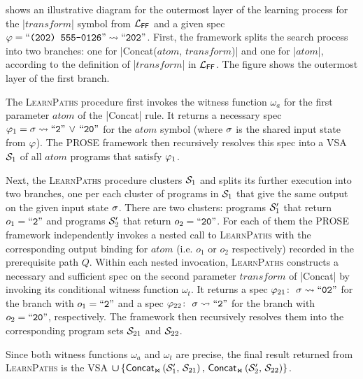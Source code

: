 \begin{example}
     shows an illustrative diagram for the outermost layer of the learning process for
    the \dslinline|$transform$| symbol from $\ffdsl$ and a given spec $\spec = \stringliteral{(202) 555-0126} \tospec
    \stringliteral{202}$.
    First, the framework splits the search process into two branches: one for \dslinline|Concat($atom$, $transform$)|
    and one for \dslinline|$atom$|, according to the definition of \dslinline|$transform$| in $\ffdsl$.
    The figure shows the outermost layer of the first branch.

    The \textsc{LearnPaths} procedure first invokes the witness function $\omega_a$ for the first
    parameter $atom$ of the \dslinline|Concat| rule.
    It returns a necessary spec $\spec_1 = \state \tospec \stringliteral{2} \,\vee\,
    \stringliteral{20}$ for the $atom$ symbol (where $\state$ is the shared input state from $\spec$).
    The PROSE framework then recursively resolves this spec into a VSA $\vsa_1$ of all $atom$ programs that satisfy
    $\spec_1$.

    Next, the \textsc{LearnPaths} procedure clusters $\vsa_1$ and splits its further execution into two branches, one
    per each cluster of programs in $\vsa_1$ that give the same output on the given input state $\state$.
    There are two clusters: programs $\vsa'_1$ that return $o_1 = \stringliteral{2}$ and programs $\vsa'_2$ that return
    $o_2 = \stringliteral{20}$.
    For each of them the PROSE framework independently invokes a nested call to \textsc{LearnPaths} with the
    corresponding output binding for $atom$ (i.e. $o_1$ or $o_2$ respectively) recorded in the prerequisite path $Q$.
    Within each nested invocation, \textsc{LearnPaths} constructs a necessary and sufficient spec on the second
    parameter $transform$ of \dslinline|Concat| by invoking its conditional witness function $\omega_t$.
    It returns a spec $\spec_{21}\colon\ \state \tospec \stringliteral{02}$ for the branch with $o_1 =
    \stringliteral{2}$ and a spec $\spec_{22}\colon\ \state \tospec \stringliteral{2}$ for the branch with $o_2 =
    \stringliteral{20}$, respectively.
    The framework then recursively resolves them into the corresponding program sets $\vsa_{21}$ and $\vsa_{22}$.

    Since both witness functions $\omega_a$ and $\omega_t$ are precise, the final result returned from
    \textsc{LearnPaths} is the VSA $\vsaunion\left\{ \joinCons[\mathsf{Concat}]\left(\vsa'_1,\, \vsa_{21}\right),\,
    \joinCons[\mathsf{Concat}]\left(\vsa'_2,\, \vsa_{22}\right) \right\}$.
\end{example}
